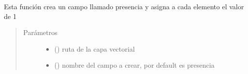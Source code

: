 \documentclass[letterpaper,10pt,spanish]{sphinxmanual}
\begin{document}
\begin{fulllineitems}
\label{\detokenize{apcsig:apcsig.capa_binaria}}
Esta función crea un campo llamado presencia y asigna 
a cada elemento el valor de 1
\begin{quote}\begin{description}
\item[{Parámetros}] \leavevmode\begin{itemize}
\item {} 
 () \textendash{} ruta de la capa vectorial

\item {} 
 () \textendash{} nombre del campo a crear, por default es presencia

\end{itemize}

\end{description}\end{quote}

\end{fulllineitems}

\end{document}
